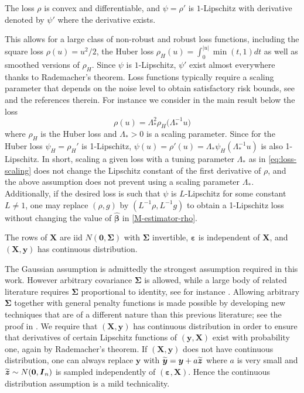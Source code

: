 \documentclass[11pt]{amsart}
\numberwithin{equation}{section}
\numberwithin{equation}{section}
\def\mathbold{\boldsymbol} %
\def\bI{\mathbold{I}}\def\hbI{{\widehat{\bI}}}\def\tbI{{\widetilde{\bI}}}
\def\bX{\mathbold{X}}\def\hbX{{\widehat{\bX}}}\def\tbX{{\widetilde{\bX}}}\def\bXbar{{\overline \bX}}
\def\by{\mathbold{y}}\def\yhat{\widehat{y}}\def\ytil{\widetilde{y}}\def\ybar{{\overline y}}\def\vby{{\bf y}}
\def\bbeta{\mathbold{\beta}}\def\betahat{\widehat{\beta}}\def\hbeta{\widehat{\beta}}
\def\hbbeta{{{\widehat{\bbeta}}}}
\def\ep{\varepsilon}\def\eps{\epsilon}\def\veps{\varepsilon}
\def\bep{ {\mathbold{\ep} }}
\def\bSigma{\mathbold{\Sigma}}\def\hbSigma{{\widehat{\bSigma}}}
\begin{document}
\begin{assumption}
    \label{assum:rho}
    The loss $\rho$ is convex and differentiable, and
    $\psi=\rho'$ is $1$-Lipschitz with derivative denoted
    by $\psi'$ where the derivative exists.
\end{assumption}
This allows for a large class of non-robust and robust loss functions,
including the square loss $\rho(u)=u^2/2$,
the Huber loss
$\rho_H(u) = \int_0^{|u|}\min(t,1)dt$ as well as
smoothed versions of $\rho_H$.
Since $\psi$ is $1$-Lipschitz, $\psi'$ exist almost everywhere
thanks to Rademacher's theorem.
Loss functions typically require a scaling parameter
that depends on the noise level to obtain
satisfactory risk bounds, see
\cite{dalalyan2019outlier} and the references therein.
For instance we consider in the main result below the loss 
\begin{equation}
    \label{eq:loss-scaling}
\rho(u)=\Lambda_*^2\rho_H\big(\Lambda_*^{-1}u\big)
\end{equation}
where $\rho_H$ is the Huber loss
and $\Lambda_*>0$ is a scaling parameter.
Since for the Huber loss $\psi_H =\rho_H'$ is 1-Lipschitz,
$\psi(u)=\rho'(u) = \Lambda_*\psi_H(\Lambda_*^{-1} u )$ is
also 1-Lipschitz.
In short, scaling a given loss with a tuning parameter
$\Lambda_*$ as in \eqref{eq:loss-scaling} does not change
the Lipschitz constant of the first derivative of $\rho$,
and the above assumption does not prevent using
a scaling parameter $\Lambda_*$.
Additionally, if the desired loss is such that $\psi$ is $L$-Lipschitz for some constant
$L\ne 1$, one may replace $(\rho,g)$ by $(L^{-1}\rho,L^{-1} g)$
to obtain a 1-Lipschitz loss without changing the value of $\hbbeta$
in \eqref{M-estimator-rho}.


\begin{assumption}
    \label{assum:Sigma}
    The rows of $\bX$ are iid $N(\mathbf{0}, \bSigma)$
    with $\bSigma$ invertible,
    $\bep$ is independent of $\bX$,
    and $(\bX,\by)$ has continuous distribution.
\end{assumption}

The Gaussian assumption is admittedly the strongest assumption
required in this work. However arbitrary covariance $\bSigma$ is allowed,
while a large body of related literature requires $\bSigma$ proportional
to identity, see for instance \cite{bayati2013estimating,bradic2015robustness,celentano2019fundamental,salehi2019impact}. Allowing arbitrary $\bSigma$ 
together with general penalty functions is made possible
by developing new techniques that are of a different nature
than this previous literature;
see the proof in .
We require that $(\bX,\by)$ has continuous distribution
in order to ensure that derivatives of certain Lipschitz functions
of $(\by,\bX)$
exist with probability one, again by Rademacher's theorem.
If $(\bX,\by)$ does not have continuous distribution, one can
always replace $\by$ with $\tby = \by + a \tbz$
where $a$ is very small and $\tbz\sim N(\mathbf{0},\bI_n)$ is sampled
independently of $(\bep,\bX)$. Hence the continuous distribution
assumption is a mild technicality.
\end{document}
